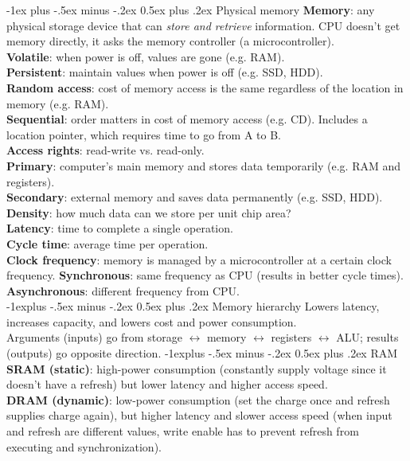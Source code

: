 \documentclass[10pt,landscape]{article}
\makeatletter
\renewcommand{\section}{\@startsection{section}{1}{0mm}%
                                {-1ex plus -.5ex minus -.2ex}%
                                {0.5ex plus .2ex}%
                                {\normalfont\scriptsize\bfseries}}
\renewcommand{\subsection}{\@startsection{subsection}{2}{0mm}%
                                {-1explus -.5ex minus -.2ex}%
                                {0.5ex plus .2ex}%
                                {\normalfont\scriptsize\bfseries}}
\makeatother
\begin{document}
\begin{multicols}{3}
\section{Physical memory}
\textbf{Memory}: any physical storage device that can \textit{store and retrieve} information. CPU doesn't get memory directly, it asks the memory controller (a microcontroller).\\
\textbf{Volatile}: when power is off, values are gone (e.g. RAM).\\
\textbf{Persistent}: maintain values when power is off (e.g. SSD, HDD).\\
\textbf{Random access}: cost of memory access is the same regardless of the location in memory (e.g. RAM).\\
\textbf{Sequential}: order matters in cost of memory access (e.g. CD). Includes a location pointer, which requires time to go from A to B.\\
\textbf{Access rights}: read-write vs. read-only.\\ 
\textbf{Primary}: computer's main memory and stores data temporarily (e.g. RAM and registers).\\
\textbf{Secondary}: external memory and saves data permanently (e.g. SSD, HDD).\\
\textbf{Density}: how much data can we store per unit chip area?\\
\textbf{Latency}: time to complete a single operation.\\
\textbf{Cycle time}: average time per operation.\\
\textbf{Clock frequency}: memory is managed by a microcontroller at a certain clock frequency.
\textbf{Synchronous}: same frequency as CPU (results in better cycle times).\\
\textbf{Asynchronous}: different frequency from CPU.\\
\subsection{Memory hierarchy}
Lowers latency, increases capacity, and lowers cost and power consumption.\\
Arguments (inputs) go from storage $\leftrightarrow$ memory $\leftrightarrow$ registers $\leftrightarrow$ ALU; results (outputs) go opposite direction.
\subsection{RAM}
\textbf{SRAM (static)}: high-power consumption (constantly supply voltage since it doesn't have a refresh) but lower latency and higher access speed.\\
\textbf{DRAM (dynamic)}: low-power consumption (set the charge once and refresh supplies charge again), but higher latency and slower access speed (when input and refresh are different values, write enable has to prevent refresh from executing and synchronization).

\end{multicols}
\end{document}
